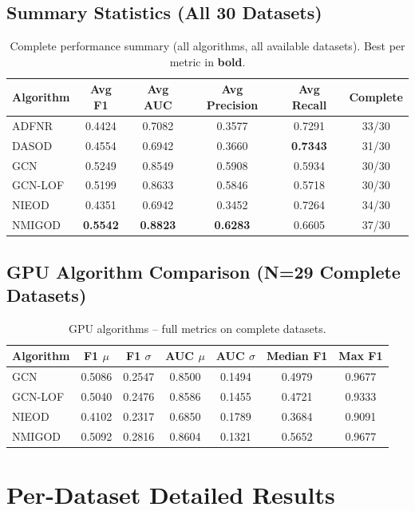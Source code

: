 \documentclass[11pt,a4paper]{article}
\begin{document}
\subsection{Summary Statistics (All 30 Datasets)}
\begin{table}[H]\centering\caption{Complete performance summary (all algorithms, all available datasets). Best per metric in \textbf{bold}.}\label{tab:summary}\small
\begin{tabular}{lcccc|c}
\toprule
Algorithm & Avg F1 & Avg AUC & Avg Precision & Avg Recall & Complete \\
\midrule
ADFNR & 0.4424 & 0.7082 & 0.3577 & 0.7291 & 33/30 \\
DASOD & 0.4554 & 0.6942 & 0.3660 & \textbf{0.7343} & 31/30 \\
GCN & 0.5249 & 0.8549 & 0.5908 & 0.5934 & 30/30 \\
GCN-LOF & 0.5199 & 0.8633 & 0.5846 & 0.5718 & 30/30 \\
NIEOD & 0.4351 & 0.6942 & 0.3452 & 0.7264 & 34/30 \\
NMIGOD & \textbf{0.5542} & \textbf{0.8823} & \textbf{0.6283} & 0.6605 & 37/30 \\
\bottomrule\end{tabular}\end{table}
\subsection{GPU Algorithm Comparison (N=29 Complete Datasets)}
\begin{table}[H]\centering\caption{GPU algorithms -- full metrics on complete datasets.}\label{tab:gpu}\small
\begin{tabular}{lcccccc}
\toprule
Algorithm & F1 $\mu$ & F1 $\sigma$ & AUC $\mu$ & AUC $\sigma$ & Median F1 & Max F1 \\
\midrule
GCN & 0.5086 & 0.2547 & 0.8500 & 0.1494 & 0.4979 & 0.9677 \\
GCN-LOF & 0.5040 & 0.2476 & 0.8586 & 0.1455 & 0.4721 & 0.9333 \\
NIEOD & 0.4102 & 0.2317 & 0.6850 & 0.1789 & 0.3684 & 0.9091 \\
NMIGOD & 0.5092 & 0.2816 & 0.8604 & 0.1321 & 0.5652 & 0.9677 \\
\bottomrule\end{tabular}\end{table}
\section{Per-Dataset Detailed Results}
\end{document}
